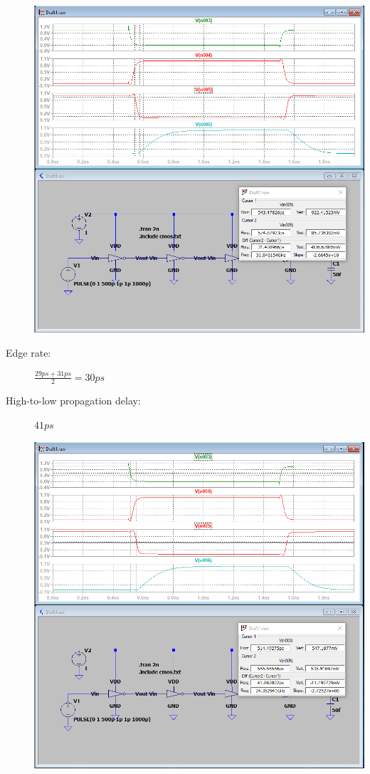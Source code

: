 \documentclass[a4paper, 11pt]{article}
\begin{document}
\begin{description}
\begin{center}
		      \includegraphics[scale=0.38]{mikro_lab3/fall_time2.PNG}
	      \end{center}
	\item[Edge rate:] $\frac{29ps + 31ps}{2} = 30ps$
	      \pagebreak
	\item[High-to-low propagation delay:] $41ps$ \hfill
	      \begin{center}
		      \includegraphics[scale=0.38]{mikro_lab3/low_to_high2.PNG}

\end{center}
\end{description}
\end{document}
